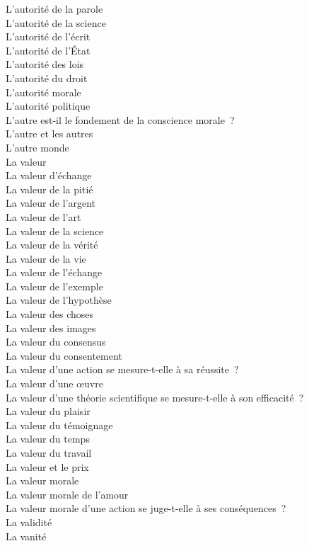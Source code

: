 \documentclass[a4paper,12pt]{article}
\begin{document}
L'autorité de la parole \\
L'autorité de la science \\
L'autorité de l'écrit \\
L'autorité de l'État \\
L'autorité des lois \\
L'autorité du droit \\
L'autorité morale \\
L'autorité politique \\
L'autre est-il le fondement de la conscience morale ? \\
L'autre et les autres \\
L'autre monde \\
La valeur \\
La valeur d'échange \\
La valeur de la pitié \\
La valeur de l'argent \\
La valeur de l'art \\
La valeur de la science \\
La valeur de la vérité \\
La valeur de la vie \\
La valeur de l'échange \\
La valeur de l'exemple \\
La valeur de l'hypothèse \\
La valeur des choses \\
La valeur des images \\
La valeur du consensus \\
La valeur du consentement \\
La valeur d'une action se mesure-t-elle à sa réussite ? \\
La valeur d'une œuvre \\
La valeur d'une théorie scientifique se mesure-t-elle à son efficacité ? \\
La valeur du plaisir \\
La valeur du témoignage \\
La valeur du temps \\
La valeur du travail \\
La valeur et le prix \\
La valeur morale \\
La valeur morale de l'amour \\
La valeur morale d'une action se juge-t-elle à ses conséquences ? \\
La validité \\
La vanité \\
\end{document}
